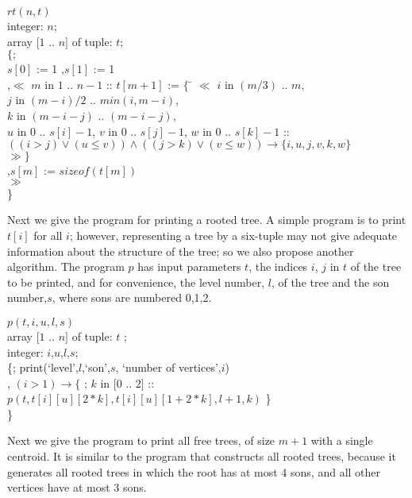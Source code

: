 \begin{tabbing}
$rt(n,t)$ \\
integer: $n$; \\
array $[ 1$ .. $n]$ of tuple: $t$; \\
$\{;$ \\
$s[0]$ := 1 ,$s[1]$ := 1 \\
,$ \ll$ $m$ in $1$ .. $n-1$ ::
$t[m+1]$ :=  $\{$ \= $\ll$ $i$ in $(m/3)$ .. $m$, \\
           \> $j$ in $(m-i)/2$ .. $min(i,m-i)$,\\
           \> $k$ in $(m-i-j)$ .. $(m-i-j)$, \\
           $u$ in $0$ .. $s[i]-1$, 
           $v$ in $0$ .. $s[j]-1$,
           $w$ in $0$ .. $s[k]-1$  :: \\
$((i > j) \vee (u \leq v)) \wedge ((j > k) \vee (v \leq w )) 
\rightarrow \{i,u,j,v,k,w\}$ \\
\> $\gg \}$ \\
,$s[m]$ := $sizeof(t[m])$ \\
$\gg$ \\
\}
\end{tabbing}

Next we give the program for printing a rooted tree.
A simple program is to print $t[i]$ for all $i$;
however, representing a tree by a six-tuple may not give adequate
information about the structure of the tree; so we also propose 
another algorithm.
The program $p$ has input parameters $t$, the indices $i$, $j$ in $t$
of the tree to be printed, and for convenience, the level number, $l$, of
the tree and the son number,$s$, where sons are numbered 0,1,2.
\begin{tabbing}
$p(t,i,u,l,s)$ \\
array $[ 1$ .. $n]$ of tuple: $t$ ; \\
integer: $i$,$u$,$l$,$s$; \\
\{;
print(`level',$l$,`son',$s$, `number of vertices',$i$) \\
, $(i > 1) \rightarrow  \{$ ; $k$ in $[ 0$ .. $2]$ :: $p(t,t[i][u][2*k], 
t[i][u][1+2*k],l+1, k)$ \} \\
\}
\end{tabbing}

Next we give the program to print all free trees, of size $m+1$
 with a single centroid.
It is similar to the program that constructs all rooted trees, because
it generates all rooted trees in which the root has at most 4 sons,
and all other vertices have at most 3 sons.


